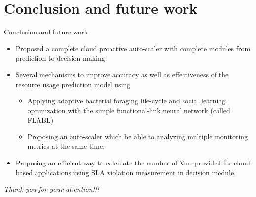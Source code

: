 \documentclass{beamer}
\begin{document}
\section{Conclusion and future work}
\begin{frame}{Conclusion and future work}
	\begin{itemize}
		\item {
		Proposed a complete cloud proactive auto-scaler with complete modules from prediction to decision making.
		}
		\item{
			Several mechanisms to improve accuracy as well as effectiveness of the resource usage prediction model using
			\begin{itemize}
			\item {
				Applying adaptive bacterial foraging life-cycle and social learning optimization with the simple functional-link neural network (called FLABL)
			}
			\item {
				Proposing an auto-scaler which be able to analyzing multiple monitoring metrics at the same time.
			}
			\end{itemize}
		}
		\item {
			Proposing an efficient way to calculate the number of Vms provided for cloud-based applications using SLA violation measurement in decision module.
		}
	\end{itemize}
\end{frame}

\begin{frame}{}
	
		\centering \Huge
		\emph{Thank you for your attention!!!}
			
		
\end{frame}
%
%
\end{document}
